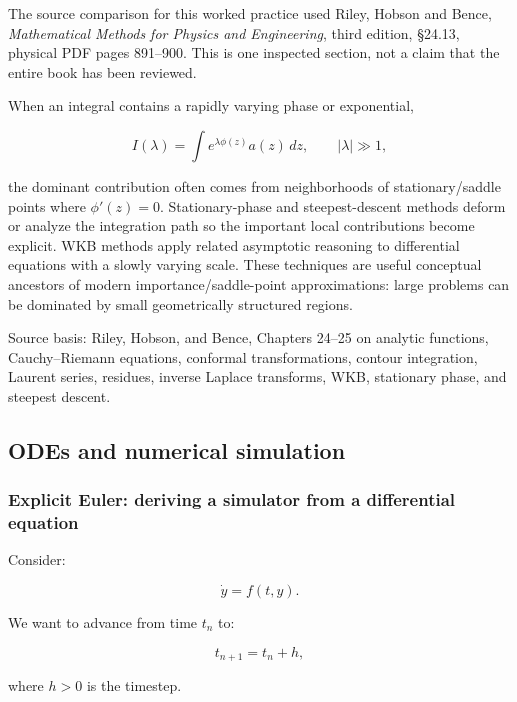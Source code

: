 The source comparison for this worked practice used Riley, Hobson and Bence, \emph{Mathematical Methods for Physics and Engineering}, third edition, §24.13, physical PDF pages 891--900. This is one inspected section, not a claim that the entire book has been reviewed.

When an integral contains a rapidly varying phase or exponential,

\[
I(\lambda)
=
\int e^{\lambda\phi(z)}a(z)\,dz,
\qquad |\lambda|\gg1,
\]

the dominant contribution often comes from neighborhoods of stationary/saddle points where \(\phi'(z)=0\). Stationary-phase and steepest-descent methods deform or analyze the integration path so the important local contributions become explicit. WKB methods apply related asymptotic reasoning to differential equations with a slowly varying scale. These techniques are useful conceptual ancestors of modern importance/saddle-point approximations: large problems can be dominated by small geometrically structured regions.

Source basis: Riley, Hobson, and Bence, Chapters 24--25 on analytic functions, Cauchy--Riemann equations, conformal transformations, contour integration, Laurent series, residues, inverse Laplace transforms, WKB, stationary phase, and steepest descent.

\subsection{ODEs and numerical simulation}\label{02-foundations-ii-ch025-odes-and-numerical-simulation}

\hypertarget{02-foundations-ii-ch025-odes-and-numerical-simulation}{}

\subsubsection{Explicit Euler: deriving a simulator from a differential equation}\label{02-foundations-ii-ch025-explicit-euler-deriving-a-simulator-from-a-differential-equation}

\hypertarget{02-foundations-ii-ch025-explicit-euler-deriving-a-simulator-from-a-differential-equation}{}

Consider:

\[
\dot y=f(t,y).
\]

We want to advance from time \(t_n\) to:

\[
t_{n+1}=t_n+h,
\]

where \(h>0\) is the timestep.

